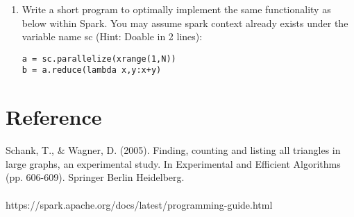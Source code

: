 \documentclass[11 pt, a4paper]{article}  %
\begin{document}
\begin{enumerate}
\begin{enumerate}
\end{enumerate}

\newpage
\item Write a short program to optimally implement the same functionality as below within Spark. You may assume spark context already exists under the variable name sc (Hint: Doable in 2 lines):\\
\begin{verbatim}
a = sc.parallelize(xrange(1,N))
b = a.reduce(lambda x,y:x+y)
\end{verbatim}

\end{enumerate}

\section*{Reference}
Schank, T., \& Wagner, D. (2005). Finding, counting and listing all triangles in large graphs, an experimental study. In Experimental and Efficient Algorithms (pp. 606-609). Springer Berlin Heidelberg.\\
\ \\
https://spark.apache.org/docs/latest/programming-guide.html
\end{document}
